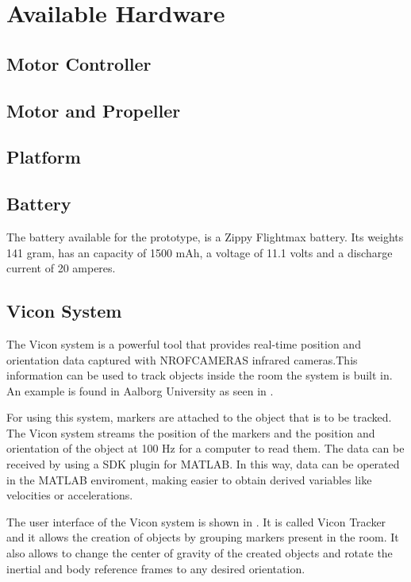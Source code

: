 \section{Available Hardware}

\subsection{Motor Controller}



\subsection{Motor and Propeller}

\subsection{Platform}

\subsection{Battery}

The battery available for the prototype, is a Zippy Flightmax battery. Its weights 141 gram, has an capacity of 1500 mAh, a voltage of 11.1 volts and a discharge current of 20 amperes. 


\subsection{Vicon System}

The Vicon system is a powerful tool that provides real-time position and orientation data captured with NROFCAMERAS infrared cameras.This information can be used to track objects inside the room the system is built in. An example is found in Aalborg University as seen in . 


For using this system, markers are attached to the object that is to be tracked. The Vicon system streams the position of the markers and the position and orientation of the object at 100 Hz for a computer to read them. The data can be received by using a SDK plugin for MATLAB. In this way, data can be operated in the MATLAB enviroment, making easier to obtain derived variables like velocities or accelerations.

The user interface of the Vicon system is shown in . It is called Vicon Tracker and it allows the creation of objects by grouping markers present in the room. It also allows to change the center of gravity of the created objects and rotate the inertial and body reference frames to any desired orientation.
